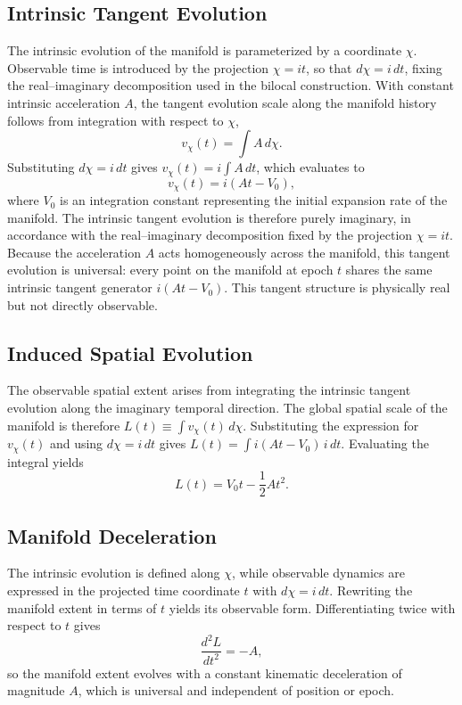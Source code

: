 \documentclass[fontsize=12pt, paper=a4]{scrartcl}
\begin{document}
\subsection{Intrinsic Tangent Evolution}

The intrinsic evolution of the manifold is parameterized by a coordinate $\chi$. Observable time is introduced by the projection $\chi = i t$, so that $d\chi = i\,dt$, fixing the real--imaginary decomposition used in the bilocal construction. With constant intrinsic acceleration $A$, the tangent evolution scale along the manifold history follows from integration with respect to $\chi$,
\[
v_\chi(t) = \int A\, d\chi .
\]
Substituting $d\chi = i\,dt$ gives $v_\chi(t) = i\!\int A\,dt$, which evaluates to
\begin{equation}
v_\chi(t) = i(At - V_0),
\label{eq:imaginary_velocity}
\end{equation}
where $V_0$ is an integration constant representing the initial expansion rate of the manifold. The intrinsic tangent evolution is therefore purely imaginary, in accordance with the real--imaginary decomposition fixed by the projection $\chi = i t$. Because the acceleration $A$ acts homogeneously across the manifold, this tangent evolution is universal: every point on the manifold at epoch $t$ shares the same intrinsic tangent generator $i(At - V_0)$. This tangent structure is physically real but not directly observable.

\subsection{Induced Spatial Evolution}

The observable spatial extent arises from integrating the intrinsic tangent evolution along the imaginary temporal direction. The global spatial scale of the manifold is therefore $L(t) \equiv \int v_\chi(t)\, d\chi$. Substituting the expression for $v_\chi(t)$ and using $d\chi = i\,dt$ gives $L(t) = \int i(At - V_0)\, i\, dt$. Evaluating the integral yields
\begin{equation}
L(t) = V_0 t - \frac{1}{2} A t^2.
\label{eq:manifold_extent}
\end{equation}

\subsection{Manifold Deceleration}

The intrinsic evolution is defined along $\chi$, while observable dynamics are expressed in the projected time coordinate $t$ with $d\chi = i\,dt$. Rewriting the manifold extent in terms of $t$ yields its observable form. Differentiating twice with respect to $t$ gives
\begin{equation}
\frac{d^2 L}{dt^2} = -A,
\label{eq:manifolddeceleration}
\end{equation}
so the manifold extent evolves with a constant kinematic deceleration of magnitude $A$, which is universal and independent of position or epoch.
\end{document}
